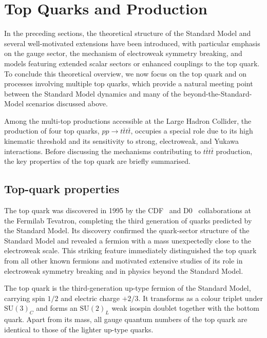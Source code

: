 \section{Top Quarks and \tttthead{} Production}
\label{sec:four-tops}

In the preceding sections, the theoretical structure of the Standard Model and several well-motivated extensions
have been introduced, with particular emphasis on the gauge sector, the mechanism of electroweak symmetry breaking,
and models featuring extended scalar sectors or enhanced couplings to the top quark.
To conclude this theoretical overview, we now focus on the top quark and on processes involving multiple top quarks,
which provide a natural meeting point between the Standard Model dynamics and many of the beyond-the-Standard-Model
scenarios discussed above.

Among the multi-top productions accessible at the Large Hadron Collider,
the production of four top quarks,
$pp \to t\bar{t}t\bar{t}$,
occupies a special role due to its high kinematic threshold and its sensitivity to strong, electroweak,
and Yukawa interactions.
Before discussing the mechanisms contributing to $t\bar{t}t\bar{t}$ production,
the key properties of the top quark are briefly summarised.

\subsection{Top-quark properties}
\label{subsec:top_properties}

The top quark was discovered in 1995 by the CDF~\cite{CDF1995} and D0~\cite{D01995} collaborations at the Fermilab Tevatron,
completing the third generation of quarks predicted by the Standard Model.
Its discovery confirmed the quark-sector structure of the Standard Model
and revealed a fermion with a mass unexpectedly close to the electroweak scale.
This striking feature immediately distinguished the top quark from all other known fermions
and motivated extensive studies of its role in electroweak symmetry breaking
and in physics beyond the Standard Model.

The top quark is the third-generation up-type fermion of the Standard Model,
carrying spin $1/2$ and electric charge $+2/3$.
It transforms as a colour triplet under $\mathrm{SU}(3)_C$
and forms an $\mathrm{SU}(2)_L$ weak isospin doublet together with the bottom quark.
Apart from its mass, all gauge quantum numbers of the top quark
are identical to those of the lighter up-type quarks.

